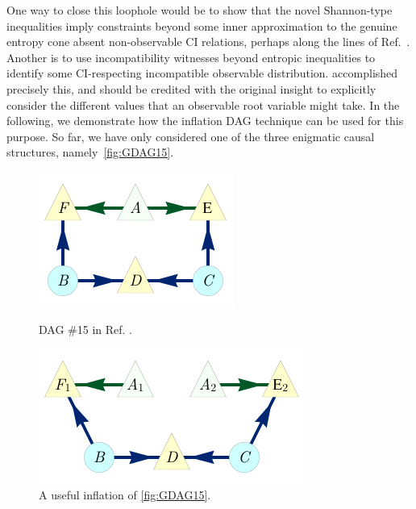 One way to close this loophole would be to show that the novel Shannon-type inequalities imply constraints beyond some inner approximation to the genuine entropy cone absent non-observable CI relations, perhaps along the lines of Ref.~\cite{weilenmann2016entropic}. Another is to use incompatibility witnesses beyond entropic inequalities to identify some CI-respecting incompatible observable distribution. \citet{piannaar2016interesting} accomplished precisely this, and should be credited with the original insight to explicitly consider the different values that an observable root variable might take. In the following, we demonstrate how the inflation DAG technique can be used for this purpose. So far, we have only considered one of the three enigmatic causal structures, namely~\cref{fig:GDAG15}.

\begin{figure}[b]
\centering
\begin{minipage}[b]{0.4\linewidth}
\centering
\includegraphics[scale=1]{scen15DAG.pdf}
\caption{DAG \#15 in Ref. \cite{pusey2014gdag}.}\label{fig:GDAG15}
\end{minipage}
\hfill
\begin{minipage}[b]{0.5\linewidth}
\centering
\includegraphics[scale=1]{scen15InflationDAG.pdf}
\caption{A useful inflation of \cref{fig:GDAG15}.}\label{fig:Inflated15}
\end{minipage}
\end{figure}

